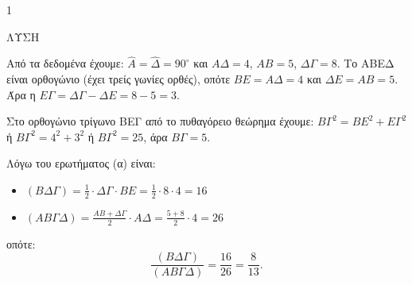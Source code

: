 \begin{ylh}{1}
    \item[Λύση από την Τράπεζα Θεμάτων]
\end{ylh}
\begin{figure}
\centering
{}
\end{figure}
ΛΥΣΗ
\begin{alist}
\item Από τα δεδομένα έχουμε: $\widehat{A} = \widehat{Δ} = 90^\circ$ και $ΑΔ=4$, $ΑΒ=5$, $ΔΓ=8$. Το ΑΒΕΔ είναι ορθογώνιο (έχει τρείς γωνίες ορθές), οπότε $ΒΕ = ΑΔ = 4$ και $ΔΕ = ΑΒ = 5$. Άρα η $ΕΓ = ΔΓ - ΔΕ = 8 - 5 = 3$.
\item Στο ορθογώνιο τρίγωνο ΒΕΓ από το πυθαγόρειο θεώρημα έχουμε: $ΒΓ^2 = ΒΕ^2 + ΕΓ^2$ ή $ΒΓ^2 = 4^2 + 3^2$ ή $ΒΓ^2 = 25$, άρα $ΒΓ = 5$.
\item 
\end{alist}
Λόγω του ερωτήματος (α) είναι:
\begin{itemize}
    \item $(ΒΔΓ) = \frac{1}{2}\cdot ΔΓ \cdot ΒΕ = \frac{1}{2}\cdot 8 \cdot 4 = 16$
    \item $(ΑΒΓΔ) = \frac{ΑΒ+ΔΓ}{2}\cdot ΑΔ = \frac{5+8}{2}\cdot 4 = 26$
\end{itemize}
οπότε:
\[ \frac{(ΒΔΓ)}{(ΑΒΓΔ)} = \frac{16}{26} = \frac{8}{13}. \]